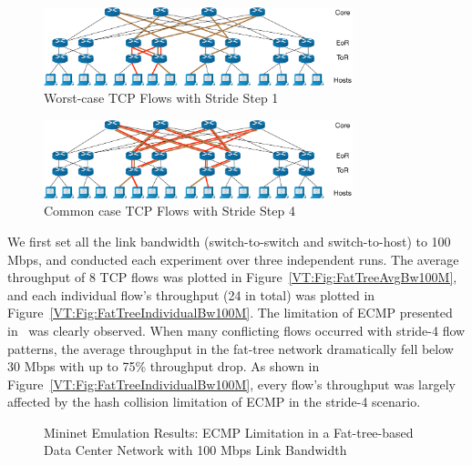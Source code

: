 \begin{figure}[ht]
    \centering
    \includegraphics[width=0.8\textwidth]{VirtualTime/figures/TopoFatTreeExampleStride1.eps}
    \caption{Worst-case TCP Flows with Stride Step 1}
    \label{VT:Fig:FattreeTopoExampleStride1}
\end{figure}

\begin{figure}[ht]
    \centering
    \includegraphics[width=0.8\textwidth]{VirtualTime/figures/TopoFatTreeExampleStride4.eps}
    \caption{Common case TCP Flows with Stride Step 4}
    \label{VT:Fig:FattreeTopoExampleStride4}
\end{figure}

We first set all the link bandwidth (switch-to-switch and switch-to-host) to 100 Mbps,
and conducted each experiment over three independent runs.
The average throughput of 8 TCP flows was plotted in Figure~\ref{VT:Fig:FatTreeAvgBw100M},
and each individual flow's throughput (24 in total) was plotted in Figure~\ref{VT:Fig:FatTreeIndividualBw100M}.
The limitation of ECMP presented in~\cite{Hedera} was clearly observed.
When many conflicting flows occurred with stride-4 flow patterns,
the average throughput in the fat-tree network dramatically fell below 30 Mbps with up to 75\% throughput drop.
As shown in Figure~\ref{VT:Fig:FatTreeIndividualBw100M}, every flow's throughput was largely
affected by the hash collision limitation of ECMP in the stride-4 scenario.

\begin{figure}[ht]
    \centering
    \caption[Emulate ECMP with Low Link Bandwidth]{Mininet Emulation Results: ECMP Limitation in a Fat-tree-based Data Center Network with 100 Mbps Link Bandwidth}
\end{figure}

